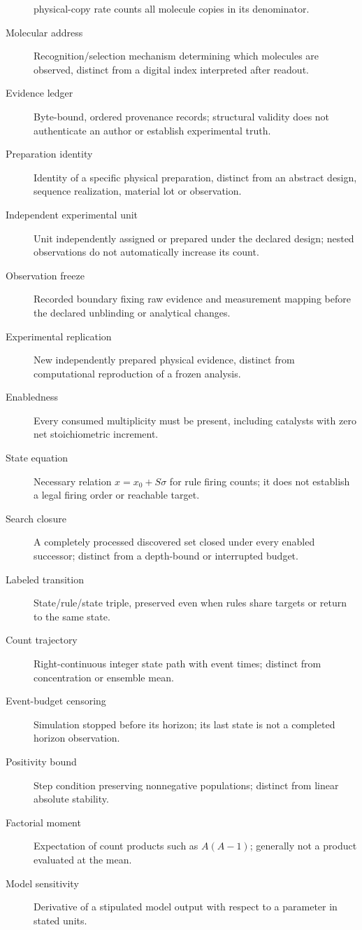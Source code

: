 \begin{description}
physical-copy rate counts all molecule copies in its denominator.
\item[Molecular address] Recognition/selection mechanism determining which
molecules are observed, distinct from a digital index interpreted after readout.
\item[Evidence ledger] Byte-bound, ordered provenance records; structural validity
does not authenticate an author or establish experimental truth.
\item[Preparation identity] Identity of a specific physical preparation, distinct
from an abstract design, sequence realization, material lot or observation.
\item[Independent experimental unit] Unit independently assigned or prepared under
the declared design; nested observations do not automatically increase its count.
\item[Observation freeze] Recorded boundary fixing raw evidence and measurement
mapping before the declared unblinding or analytical changes.
\item[Experimental replication] New independently prepared physical evidence,
distinct from computational reproduction of a frozen analysis.
\item[Enabledness] Every consumed multiplicity must be present, including catalysts
with zero net stoichiometric increment.
\item[State equation] Necessary relation $x=x_0+S\sigma$ for rule firing counts;
it does not establish a legal firing order or reachable target.
\item[Search closure] A completely processed discovered set closed under every
enabled successor; distinct from a depth-bound or interrupted budget.
\item[Labeled transition] State/rule/state triple, preserved even when rules share
targets or return to the same state.
\item[Count trajectory] Right-continuous integer state path with event times; distinct from concentration or ensemble mean.
\item[Event-budget censoring] Simulation stopped before its horizon; its last state is not a completed horizon observation.
\item[Positivity bound] Step condition preserving nonnegative populations; distinct from linear absolute stability.
\item[Factorial moment] Expectation of count products such as $A(A-1)$; generally not a product evaluated at the mean.
\item[Model sensitivity] Derivative of a stipulated model output with respect to a parameter in stated units.

\end{description}
